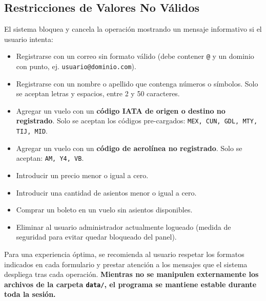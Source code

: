 \documentclass[12pt, letterpaper]{article}
\begin{document}
\subsection{Restricciones de Valores No Válidos}
El sistema bloquea y cancela la operación mostrando un mensaje informativo si el usuario intenta:
\begin{itemize}
	\item Registrarse con un correo sin formato válido (debe contener \texttt{@} y un dominio con punto, ej. \texttt{usuario@dominio.com}).
	\item Registrarse con un nombre o apellido que contenga números o símbolos. Solo se aceptan letras y espacios, entre 2 y 50 caracteres.
	\item Agregar un vuelo con un \textbf{código IATA de origen o destino no registrado}. Solo se aceptan los códigos pre-cargados: \texttt{MEX, CUN, GDL, MTY, TIJ, MID}.
	\item Agregar un vuelo con un \textbf{código de aerolínea no registrado}. Solo se aceptan: \texttt{AM, Y4, VB}.
	\item Introducir un precio menor o igual a cero.
	\item Introducir una cantidad de asientos menor o igual a cero.
	\item Comprar un boleto en un vuelo sin asientos disponibles.
	\item Eliminar al usuario administrador actualmente logueado (medida de seguridad para evitar quedar bloqueado del panel).
\end{itemize}

Para una experiencia óptima, se recomienda al usuario respetar los formatos indicados en cada formulario y prestar atención a los mensajes que el sistema despliega tras cada operación. \textbf{Mientras no se manipulen externamente los archivos de la carpeta \texttt{data/}, el programa se mantiene estable durante toda la sesión.}
\end{document}
